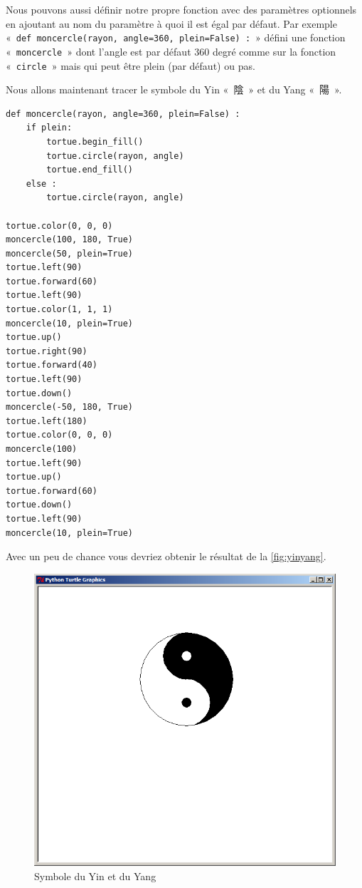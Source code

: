 Nous pouvons aussi définir notre propre fonction avec des paramètres optionnels en ajoutant au nom du paramètre à quoi il est égal par défaut. Par exemple « \texttt{def moncercle(rayon, angle=360, plein=False) :} » défini une fonction « \texttt{moncercle} »  dont l'angle est par défaut 360 degré comme sur la fonction « \texttt{circle} » mais qui peut être plein (par défaut) ou pas.


Nous allons maintenant tracer le symbole du Yin « {陰} »  et du Yang « {陽} ».

\begin{Verbatim}[frame=single,rulecolor=\color{mbleu}, label=à taper]
def moncercle(rayon, angle=360, plein=False) :
    if plein:
        tortue.begin_fill()
        tortue.circle(rayon, angle)
        tortue.end_fill()
    else :
        tortue.circle(rayon, angle)

tortue.color(0, 0, 0)
moncercle(100, 180, True)
moncercle(50, plein=True)
tortue.left(90)
tortue.forward(60)
tortue.left(90)
tortue.color(1, 1, 1)
moncercle(10, plein=True)
tortue.up()
tortue.right(90)
tortue.forward(40)
tortue.left(90)
tortue.down()
moncercle(-50, 180, True)
tortue.left(180)
tortue.color(0, 0, 0)
moncercle(100)
tortue.left(90)
tortue.up()
tortue.forward(60)
tortue.down()
tortue.left(90)
moncercle(10, plein=True)
\end{Verbatim}

Avec un peu de chance vous devriez obtenir le résultat de la \autoref{fig:yinyang}.

\begin{figure}[h!]
\centering
\includegraphics[scale=0.4]{images/yinyang}
\caption{Symbole du Yin et du Yang}\label{fig:yinyang}
\end{figure}

